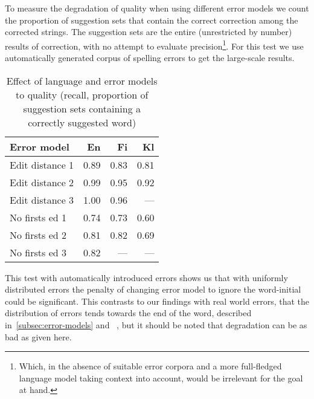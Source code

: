 \documentclass[11pt]{article}
\begin{document}
To measure the degradation of quality when using different error models we
count the proportion of suggestion sets that contain the correct correction
among the corrected strings. The suggestion sets are the entire (unrestricted
by number) results of correction, with no attempt to evaluate precision\footnote{Which,
in the absence of suitable error corpora and a more full-fledged language model
taking context into account, would be irrelevant for the goal at hand.}.
For this test we use automatically generated corpus
of spelling errors to get the large-scale results.

\begin{table}[h]
\begin{center}
\begin{scriptsize}
\begin{tabular}{|l|rrr|}
\hline
\bf Error model & \bf En & \bf Fi & \bf Kl\\ 
\hline
\hline
\hline
Edit distance 1 &
0.89&0.83&0.81
\\
Edit distance 2 &
0.99&0.95&0.92
\\
Edit distance 3 &
1.00&0.96&---
\\
No firsts ed 1 & 
0.74&0.73&0.60
\\
No firsts ed 2 &
0.81&0.82&0.69
\\
No firsts ed 3 &
0.82&---&---
\\
\hline
\end{tabular}
\end{scriptsize}
\end{center}
\caption{\label{table:error-model-vs-language} Effect of language and 
error models to quality (recall, proportion of suggestion sets containing a
correctly suggested word)}
\end{table}

This test with automatically introduced errors shows us that with uniformly
distributed errors the penalty of changing error model to ignore the
word-initial could be significant. This contrasts to our findings with real
world errors, that the distribution of errors tends towards the end of the word,
described in~\ref{subsec:error-models} and ~\cite{Bhagat/2007},
but it should be noted that degradation can be as bad as given here.
\end{document}
